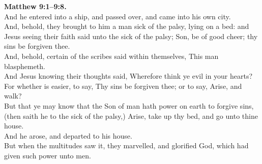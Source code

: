 \documentclass[10pt]{article} %
\begin{document}
{\begin{minipage}[t]{0.45\textwidth}
\textbf{Matthew 9:1--9:8.}\\
And he entered into a ship, and passed over, and came into his own city.\\
And, behold, they brought to him a man sick of the palsy, lying on a bed: and Jesus seeing their faith said unto the sick of the palsy; Son, be of good cheer; thy sins be forgiven thee.\\
And, behold, certain of the scribes said within themselves, This man blasphemeth.\\
And Jesus knowing their thoughts said, Wherefore think ye evil in your hearts?\\
For whether is easier, to say, Thy sins be forgiven thee; or to say, Arise, and walk?\\
But that ye may know that the Son of man hath power on earth to forgive sins, (then saith he to the sick of the palsy,) Arise, take up thy bed, and go unto thine house.\\
And he arose, and departed to his house.\\
But when the multitudes saw it, they marvelled, and glorified God, which had given such power unto men.\\

\end{minipage}}
\vspace*{\fill}
\newpage
\Huge%
\vspace*{\fill}
\begin{spacing}{1.4}
\end{spacing}
\vspace*{\fill}
\end{document}
